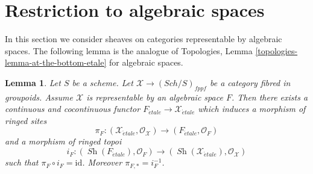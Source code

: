 \documentclass{stacks-project}
\theoremstyle{plain}
\newtheorem{lemma}[subsection]{Lemma}
\theoremstyle{definition}
\theoremstyle{remark}
\numberwithin{equation}{subsection}
\def\Sch{\mathit{Sch}}
\def\Sh{\mathop{\mathit{Sh}}\nolimits}
\def\etale{{\acute{e}tale}}
\begin{document}
\section{Restriction to algebraic spaces}
\label{section-restriction-algebraic-spaces}

\noindent
In this section we consider sheaves on categories representable by
algebraic spaces. The following lemma is the analogue of
Topologies, Lemma \ref{topologies-lemma-at-the-bottom-etale}
for algebraic spaces.

\begin{lemma}
\label{lemma-compare}
Let $S$ be a scheme. Let $\mathcal{X} \to (\Sch/S)_{fppf}$ be a category
fibred in groupoids. Assume $\mathcal{X}$ is representable by an algebraic
space $F$. Then there exists a continuous and cocontinuous functor
$
F_\etale \to \mathcal{X}_\etale
$
which induces a morphism of ringed sites
$$
\pi_F :
(\mathcal{X}_\etale, \mathcal{O}_\mathcal{X})
\longrightarrow
(F_\etale, \mathcal{O}_F)
$$
and a morphism of ringed topoi
$$
i_F :
(\Sh(F_\etale), \mathcal{O}_F)
\longrightarrow
(\Sh(\mathcal{X}_\etale), \mathcal{O}_\mathcal{X})
$$
such that $\pi_F \circ i_F = \text{id}$. Moreover $\pi_{F, *} = i_F^{-1}$.
\end{lemma}
\end{document}
